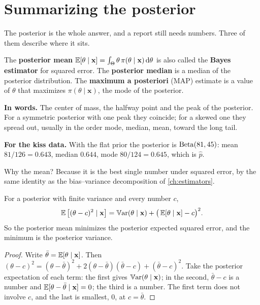 \section{Summarizing the posterior}
\label{sec:bayes-summaries}

The posterior is the whole answer, and a report still needs numbers.
Three of them describe where it sits.

\begin{definition}
\label{def:bayes-estimators}
The \textbf{posterior mean} $\operatorname*{\mathbb{E}}[\theta \mid \mathbf{x}] = \int_\Theta \theta\,\pi(\theta \mid \mathbf{x})\,\mathrm{d}\theta$ is also called the \textbf{Bayes estimator} for squared error. The \textbf{posterior median} is a median of the posterior distribution. The \textbf{maximum a posteriori} (MAP) estimate is a value of $\theta$ that maximizes $\pi(\theta \mid \mathbf{x})$, the mode of the posterior.
\end{definition}

\begin{inwords}
\textbf{In words.} The center of mass, the halfway point and the peak of the posterior. For a symmetric posterior with one peak they coincide; for a skewed one they spread out, usually in the order mode, median, mean, toward the long tail.
\par\smallskip
\textbf{For the kiss data.} With the flat prior the posterior is $\mathrm{Beta}(81, 45)$: mean $81/126 = 0.643$, median $0.644$, mode $80/124 = 0.645$, which is $\hat{p}$.
\end{inwords}

Why the mean?
Because it is the best single number under squared error, by the same identity as the bias--variance decomposition of \cref{ch:estimators}.

\begin{proposition}
\label{prop:posterior-mean}
For a posterior with finite variance and every number $c$,
\[
\operatorname*{\mathbb{E}}\big[(\theta - c)^2 \mid \mathbf{x}\big] = \operatorname*{\mathbb{V}\text{ar}}(\theta \mid \mathbf{x}) + \big(\operatorname*{\mathbb{E}}[\theta \mid \mathbf{x}] - c\big)^2.
\]
So the posterior mean minimizes the posterior expected squared error, and the minimum is the posterior variance.
\end{proposition}

\begin{proof}
Write $\bar\theta = \operatorname*{\mathbb{E}}[\theta \mid \mathbf{x}]$. Then $(\theta - c)^2 = (\theta - \bar\theta)^2 + 2(\theta - \bar\theta)(\bar\theta - c) + (\bar\theta - c)^2$. Take the posterior expectation of each term: the first gives $\operatorname*{\mathbb{V}\text{ar}}(\theta \mid \mathbf{x})$; in the second, $\bar\theta - c$ is a number and $\operatorname*{\mathbb{E}}[\theta - \bar\theta \mid \mathbf{x}] = 0$; the third is a number. The first term does not involve $c$, and the last is smallest, $0$, at $c = \bar\theta$.
\end{proof}


